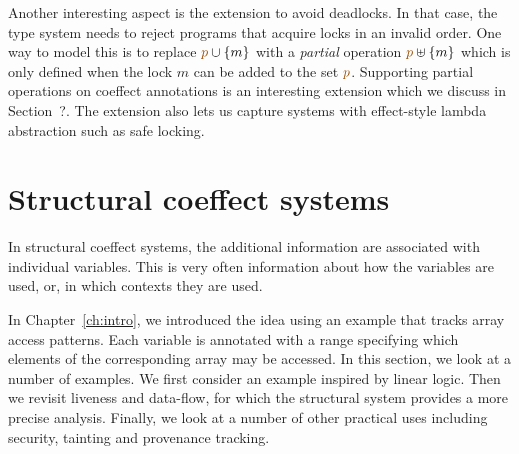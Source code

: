 Another interesting aspect is the extension to avoid deadlocks. In that case, the type system
needs to reject programs that acquire locks in an invalid order. One way to model this is to 
replace $\aclrd{p} \cup \{m\}$ with a \emph{partial} operation $\aclrd{p} \uplus \{m\}$ which
is only defined when the lock $m$ can be added to the set $\aclrd{p}$. Supporting partial 
operations on coeffect annotations is an interesting extension which we discuss in Section~?.
The extension also lets us capture systems with effect-style lambda abstraction such as safe
locking.




%	                                                                      
%	                                                                      

\section{Structural coeffect systems}
\label{sec:applications-structural}

In structural coeffect systems, the additional information are associated with individual variables.
This is very often information about how the variables are used, or, in which contexts they are 
used. 

In Chapter~\ref{ch:intro}, we introduced the idea using an example that tracks array access patterns.  
Each variable is annotated with a range specifying which elements of the corresponding array 
may be accessed. In this section, we look at a number of examples. We first consider an example
inspired by linear logic. Then we revisit liveness and data-flow, for which the structural system 
provides a more precise analysis. Finally, we look at a number of other practical uses including 
security, tainting and provenance tracking.

